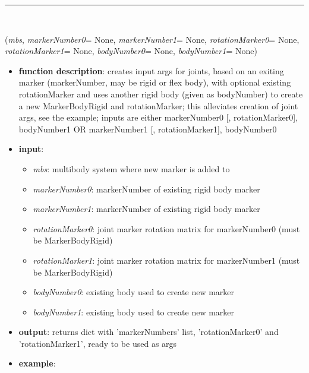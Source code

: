 \begin{itemize}[leftmargin=1.4cm]
\begin{itemize}[leftmargin=1.4cm]
\begin{itemize}[leftmargin=1.4cm]
\begin{itemize}[leftmargin=0.5cm]
%
\noindent\rule{8cm}{0.75pt}\vspace{1pt} \\ 
\begin{flushleft}
\label{sec:basicUtilities:GetJointArgs}
({\it mbs}, {\it markerNumber0}= None, {\it markerNumber1}= None, {\it rotationMarker0}= None, {\it rotationMarker1}= None, {\it bodyNumber0}= None, {\it bodyNumber1}= None)
\end{flushleft}
\setlength{\itemindent}{0.7cm}
\begin{itemize}[leftmargin=0.7cm]
\item[--]
{\bf function description}: creates input args for joints, based on an exiting marker (markerNumber, may be rigid or flex body), with optional existing rotationMarker and uses another rigid body (given as bodyNumber) to create a new MarkerBodyRigid and rotationMarker; this alleviates creation of joint args, see the example; inputs are either markerNumber0 [, rotationMarker0], bodyNumber1 OR markerNumber1 [, rotationMarker1], bodyNumber0
\item[--]
{\bf input}: \vspace{-6pt}
\begin{itemize}[leftmargin=1.2cm]
\setlength{\itemindent}{-0.7cm}
\item[]{\it mbs}: multibody system where new marker is added to
\item[]{\it markerNumber0}: markerNumber of existing rigid body marker
\item[]{\it markerNumber1}: markerNumber of existing rigid body marker
\item[]{\it rotationMarker0}: joint marker rotation matrix for markerNumber0 (must be MarkerBodyRigid)
\item[]{\it rotationMarker1}: joint marker rotation matrix for markerNumber1 (must be MarkerBodyRigid)
\item[]{\it bodyNumber0}: existing body used to create new marker
\item[]{\it bodyNumber1}: existing body used to create new marker
\end{itemize}
\item[--]
{\bf output}: returns dict with 'markerNumbers' list, 'rotationMarker0' and 'rotationMarker1', ready to be used as args
\item[--]
{\bf example}: \vspace{-12pt}\ei\begin{lstlisting}[language=Python, xleftmargin=36pt]

\end{lstlisting}
\end{itemize}
\end{itemize}
\end{itemize}
\end{itemize}
\end{itemize}
